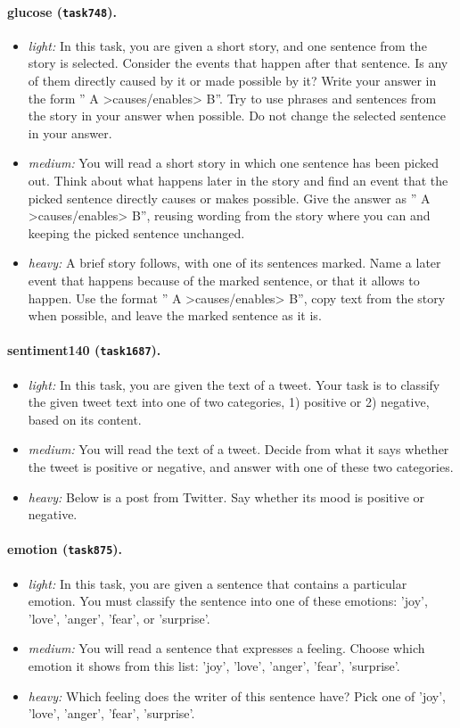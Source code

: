 \paragraph{glucose (\texttt{task748}).}
\begin{itemize}
  \item \emph{light:} In this task, you are given a short story, and one sentence from the story is selected. Consider the events that happen after that sentence. Is any of them directly caused by it or made possible by it? Write your answer in the form '' A \textgreater{}causes/enables\textgreater{} B''. Try to use phrases and sentences from the story in your answer when possible. Do not change the selected sentence in your answer.
  \item \emph{medium:} You will read a short story in which one sentence has been picked out. Think about what happens later in the story and find an event that the picked sentence directly causes or makes possible. Give the answer as '' A \textgreater{}causes/enables\textgreater{} B'', reusing wording from the story where you can and keeping the picked sentence unchanged.
  \item \emph{heavy:} A brief story follows, with one of its sentences marked. Name a later event that happens because of the marked sentence, or that it allows to happen. Use the format '' A \textgreater{}causes/enables\textgreater{} B'', copy text from the story when possible, and leave the marked sentence as it is.
\end{itemize}
\paragraph{sentiment140 (\texttt{task1687}).}
\begin{itemize}
  \item \emph{light:} In this task, you are given the text of a tweet. Your task is to classify the given tweet text into one of two categories, 1) positive or 2) negative, based on its content.
  \item \emph{medium:} You will read the text of a tweet. Decide from what it says whether the tweet is positive or negative, and answer with one of these two categories.
  \item \emph{heavy:} Below is a post from Twitter. Say whether its mood is positive or negative.
\end{itemize}
\paragraph{emotion (\texttt{task875}).}
\begin{itemize}
  \item \emph{light:} In this task, you are given a sentence that contains a particular emotion. You must classify the sentence into one of these emotions: 'joy', 'love', 'anger', 'fear', or 'surprise'.
  \item \emph{medium:} You will read a sentence that expresses a feeling. Choose which emotion it shows from this list: 'joy', 'love', 'anger', 'fear', 'surprise'.
  \item \emph{heavy:} Which feeling does the writer of this sentence have? Pick one of 'joy', 'love', 'anger', 'fear', 'surprise'.
\end{itemize}
